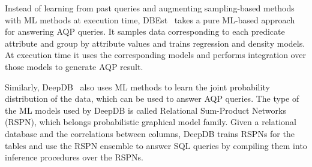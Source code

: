 
Instead of learning from past queries and augmenting sampling-based methods with ML methods at execution time, DBEst~\cite{dbest} takes a pure ML-based approach for answering AQP queries.
It samples data corresponding to each predicate attribute and group by attribute values and trains regression and density models.
At execution time it uses the corresponding models and performs integration over those models to generate AQP result.

Similarly, DeepDB~\cite{deepdb} also uses ML methods to learn the joint probability distribution of the data, which can be used to answer AQP queries.
The type of the ML models used by DeepDB is called Relational Sum-Product Networks (RSPN), which belongs probabilistic graphical model family.
Given a relational database and the correlations between columns, DeepDB trains RSPNs for the tables and use the RSPN ensemble to answer SQL queries by compiling them into inference procedures over the RSPNs.













